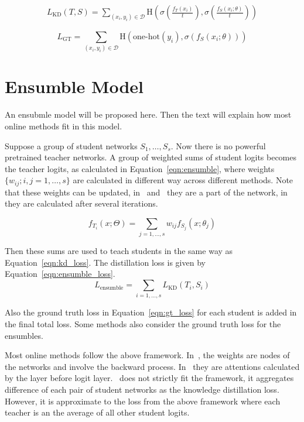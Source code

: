 \documentclass[10pt,twocolumn,letterpaper]{article}
\begin{document}
\begin{equation}
\label{eqn:kd_loss}
   \begin{split}
   L_{\textrm{KD}}(T, S) = \sum\limits_{(x_i, y_i)\in \mathcal D}{\textrm{H}(\sigma(\frac{f_T(x_i)}{t}), \sigma(\frac{f_S(x_i; \theta)}{t}))}
   \end{split}
\end{equation}

\begin{equation}
\label{eqn:gt_loss}
L_{\textrm{GT}}=\sum\limits_{(x_i, y_i)\in \mathcal D}{\textrm{H}(\textrm{one-hot}(y_i),\sigma(f_S(x_i; \theta)))}
\end{equation}

\section{Ensumble Model}\label{ensubmle_model}
An ensubmle model will be proposed here. Then the text will explain how most online methods fit in this model.

Suppose a group of student networks $S_1,\dots, S_s$. Now there is no powerful pretrained teacher networks. A group of weighted sums of student logits becomes the teacher logits, as calculated in Equation~\ref{eqn:ensumble}, where
weights $\{w_{ij}; i, j=1,\dots,s\}$ are calculated in different way across different methods. Note that these weights
can be updated, in~\cite{lan2018knowledge} and~\cite{chen2020online}
they are a part of the network, in~\cite{guo2020online} they are calculated after several iterations.

\begin{equation}
\label{eqn:ensumble}
f_{T_i}(x; \Theta) = \sum\limits_{j=1,\dots,s}{w_{ij} f_{S_j}(x; \theta_j)}
\end{equation}

Then these sums are used to teach students in the same way as Equation~\ref{eqn:kd_loss}. The distillation loss is given by Equation~\ref{eqn:ensumble_loss}.
\begin{equation}
\label{eqn:ensumble_loss}
L_{\textrm{ensumble}}=\sum\limits_{i=1,\dots,s}{L_{\textrm{KD}}(T_i, S_i)}
\end{equation}

Also the ground truth loss in Equation~\ref{eqn:gt_loss} for each student is added in the final total loss. Some methods also consider
the ground truth loss for the ensumbles.

Most online methods follow the above framework. In~\cite{lan2018knowledge}, the weights are nodes of the networks and involve the backward process.
In~\cite{chen2020online} they are attentions calculated by the layer before logit layer.~\cite{zhang2018deep} does not strictly fit the framework, it
aggregates difference of each pair of student networks as the knowledge distillation loss. However, it is approximate to the loss from the above framework where each teacher is
an the average of all other student logits.
\end{document}

